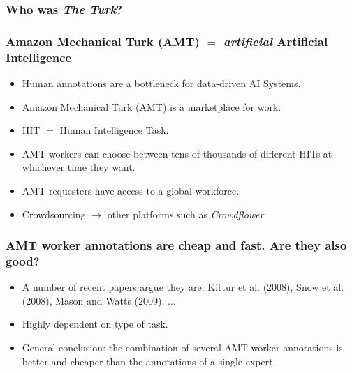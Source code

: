 \documentclass[10pt]{beamer}
\newenvironment{itemwide}%
{\begin{itemize}%
    \setlength{\itemsep}{5pt}%
    \setlength{\parskip}{5pt}}%
  {\end{itemize}}
\begin{document}
\begin{frame}
  \frametitle{Who was \textit{The Turk}?}
  \begin{center}
  \end{center}
\end{frame}

\begin{frame}
  \frametitle{Amazon Mechanical Turk (AMT) $=$ \textit{artificial} Artificial Intelligence}
	\begin{itemwide}
 	\item Human annotations are a bottleneck for data-driven AI Systems.
	\item Amazon Mechanical Turk (AMT) is a marketplace for work.
	\item HIT $=$ Human Intelligence Task.
	\item AMT workers can choose between tens of thousands of different HITs at whichever time they want.
	\item AMT requesters have access to a global workforce.
	\item Crowdsourcing $\rightarrow$ other platforms such as \textit{Crowdflower}
	\end{itemwide}
\end{frame}

\begin{frame}
  \frametitle{AMT worker annotations are cheap and fast. Are they also good?}
	\begin{itemwide}
 	\item A number of recent papers argue they are: Kittur et al. (2008), Snow et al. (2008), Mason and Watts (2009), $\ldots$
	\item Highly dependent on type of task.
	\item General conclusion: the combination of several AMT worker annotations is better and cheaper than the annotations of a single expert.
	\end{itemwide}
\end{frame}
\end{document}

